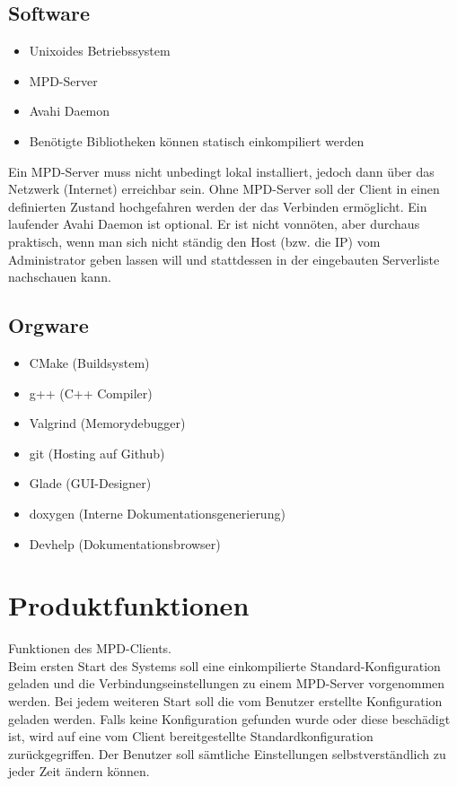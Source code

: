 \subsection{Software}
\begin{itemize}
	\item Unixoides Betriebssystem
	\item MPD-Server 
	\item Avahi Daemon
	\item Benötigte Bibliotheken können statisch einkompiliert werden
\end{itemize}
Ein MPD-Server muss nicht unbedingt lokal installiert, jedoch dann über das Netzwerk (Internet) erreichbar sein.
Ohne MPD-Server soll der Client in einen definierten Zustand hochgefahren werden der das Verbinden ermöglicht.
Ein laufender Avahi Daemon ist optional. Er ist nicht vonnöten, aber durchaus praktisch, wenn man sich nicht ständig den Host (bzw. die IP) 
vom Administrator geben lassen will und stattdessen in der eingebauten Serverliste nachschauen kann.

\subsection{Orgware}
\begin{itemize}
	\item CMake (Buildsystem)
	\item g++ (C++ Compiler)
	\item Valgrind (Memorydebugger)
	\item git (Hosting auf Github) 
	\item Glade (GUI-Designer)
	\item doxygen  (Interne Dokumentationsgenerierung)
	\item Devhelp (Dokumentationsbrowser)
\end{itemize}

\section{Produktfunktionen}
Funktionen des MPD-Clients.\ \\
Beim ersten Start des Systems soll eine einkompilierte Standard-Konfiguration geladen und die Verbindungseinstellungen
zu einem MPD-Server vorgenommen werden. Bei jedem weiteren Start soll die vom Benutzer erstellte Konfiguration geladen werden.
Falls keine Konfiguration gefunden wurde oder diese beschädigt ist,
wird auf eine vom Client bereitgestellte Standardkonfiguration zurückgegriffen. Der Benutzer soll sämtliche
Einstellungen selbstverständlich zu jeder Zeit ändern können.
\newpage
